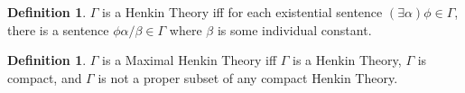 \documentclass[12pt]{article}
\theoremstyle{definition}
\newtheorem{definition}[theorem]{Definition}
\theoremstyle{remark}
\begin{document}
\begin{definition}
	$\Gamma$ is a Henkin Theory iff for each existential sentence $(\exists \alpha)\phi \in \Gamma$, there is a sentence $\phi\alpha/\beta \in \Gamma$ where $\beta$ is some individual constant.
\end{definition}

\begin{definition}
	$\Gamma$ is a Maximal Henkin Theory iff $\Gamma$ is a Henkin Theory, $\Gamma$ is compact, and $\Gamma$ is not a proper subset of any compact Henkin Theory.
\end{definition}



\end{document}

